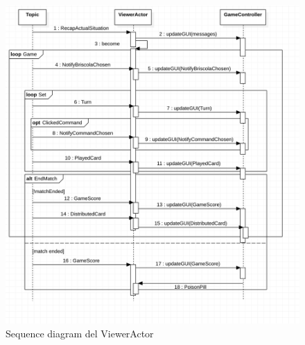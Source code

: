 \begin{itemize}
     
         \begin{figure}[!tbh]
    \centering
 	 \includegraphics[width=\linewidth]{sequenceDiagramViewerActor.png}
 	 \caption{Sequence diagram del ViewerActor}
  	\label{fig:viewer_actor}
	\end{figure}
	
	
	\clearpage
	

\end{itemize}
